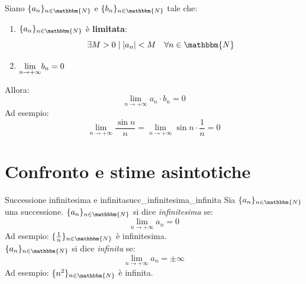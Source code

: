 \documentclass[12pt]{report}
\newcounter{theorem}
\newcounter{definition}
\newcommand{\nmu}{}
\begin{document}
	\begin{theorem}{}{}
		Siano $\{a_n\}_{n \in \mathbbm{N}}$ e $\{b_n\}_{n\in \mathbbm{N}}$ tale che:
		\begin{enumerate}
			\item $\{a_n\}_{n \in \mathbbm{N}}$ è \textbf{limitata}:
			\[
			\exists M > 0 \mid |a_n| < M \quad \forall n \in \mathbbm{N}
			\]
			\item $\mathlarger{\lim_{n \to +\infty}}b_n = 0$
		\end{enumerate}
		Allora:
		\[
		\lim_{n \to +\infty}a_n \cdot b_n = 0
		\]
		Ad esempio: \[
		\lim_{n \to +\infty}\frac{\sin n}{n}=\lim_{n \to +\infty}\sin n \cdot \frac{1}{n} = 0
		\]
	\end{theorem}
	\section{Confronto e stime asintotiche}
	\begin{definition}{\nmu Successione infinitesima e infinita}{succ_infinitesima_infinita}
		Sia $\{a_n\}_{n \in \mathbbm{N}}$ una successione.
		$\{a_n\}_{n \in \mathbbm{N}}$ si dice \textit{infinitesima} se:
		\[
		\lim_{n \to +\infty}a_n = 0
		\]
		Ad esempio: $\{\frac{1}{n}\}_{n \in \mathbbm{N}}$ è infinitesima. \\
		$\{a_n\}_{n \in \mathbbm{N}}$ si dice \textit{infinita} se:
		\[
		\lim_{n \to +\infty}a_n = \pm\infty
		\]
		Ad esempio: $\{n^2\}_{n \in \mathbbm{N}}$ è infinita.
	\end{definition}
\end{document}
